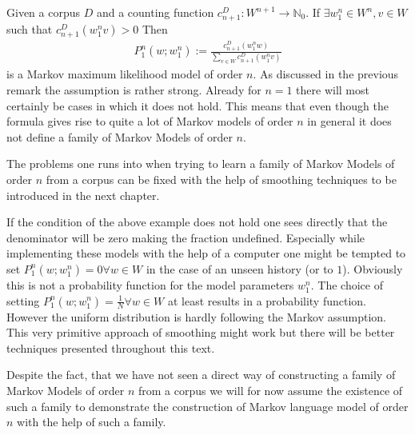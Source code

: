 \documentclass[•]{book}
\begin{document}
\begin{example}
Given a corpus $D$ and a counting function $c_{n+1}^D:W^{n+1}\longrightarrow\mathbb{N}_0$. If $\exists w_1^n \in W^{n},v\in W$ such that $c_{n+1}^D(w_1^nv) > 0$ Then \begin{align*}
P_{1}^n(w;w_1^n):=\frac{c_{n+1}^D(w_1^nw)}{\sum\limits_{v\in W}{c_{n+1}^D(w_1^nv)}}
\end{align*} is a Markov maximum likelihood model of order $n$.  
As discussed in the previous remark the assumption is rather strong. 
Already for $n = 1$ there will most certainly be cases in which it does not hold. 
This means that even though the formula gives rise to quite a lot of Markov models of order $n$ in general it does not define a family of Markov Models of order $n$. 

\end{example}

The problems one runs into when trying to learn a family of Markov Models of order $n$ from a corpus can be fixed with the help of smoothing techniques to be introduced in the next chapter.

\begin{remark}
If the condition of the above example does not hold one sees directly that the denominator will be zero making the fraction undefined. 
Especially while implementing these models with the help of a computer one might be tempted to set $P_1^n(w;w_1^n) = 0 \forall w\in W$ in the case of an unseen history (or to $1$). Obviously this is not a probability function for the model parameters $w_1^n$. The choice of setting $P_1^n(w;w_1^n) = \frac{1}{N} \forall w\in W$ at least results in a probability function. However the uniform distribution is hardly following the Markov assumption. This very primitive approach of smoothing might work but there will be better techniques presented throughout this text.
 \end{remark}

Despite the fact, that we have not seen a direct way of constructing a family of Markov Models of order $n$ from a corpus we will for now assume the existence of such a family to demonstrate the construction of Markov language model of order $n$ with the help of such a family.  
\end{document}
